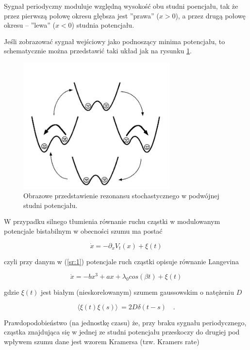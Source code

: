   Sygnał periodyczny moduluje względną wysokość obu studni poencjału, tak że przez pierwszą połowę okresu głębsza jest ''prawa'' ($x>0$), a przez drugą połowę okresu -- ''lewa'' ($x<0$) studnia potencjału.

  Jeśli zobrazować sygnał wejściowy jako podnoszący minima potencjału, to schematycznie można przedstawić taki układ jak na rysunku \ref{fig:graphics:double_well}.

  \begin{figure}
    \includegraphics[width=80mm]{images/sr.jpg}
    \caption{Obrazowe przedstawienie rezonansu stochastycznego w podwójnej studni potencjału.}
    \label{fig:graphics:double_well}
  \end{figure}

  W przypadku silnego tłumienia równanie ruchu cząstki w modulowanym potencjale bistabilnym w obecności szumu ma postać

  \begin{equation} \label{sr:2}
    \dot x = - \partial_x V_t(x) + \xi (t)
  \end{equation}

  czyli przy danym w (\ref{sr:1}) potencjale ruch cząstki opisuje równanie Langevina

  \begin{equation} \label{sr:3}
    \dot x = -bx ^3 + ax + \lambda_0 cos(\beta t) + \xi (t)
  \end{equation}

  gdzie $\xi (t)$ jest białym (nieskorelowanym) szumem gaussowskim o natężeniu $D$

  \begin{equation} \label{sr:noise_correlation}
    \langle \xi(t) \xi(s) \rangle\ = 2 D \delta (t-s) \quad .
  \end{equation}

  Prawdopodobieństwo (na jednostkę czasu) że, przy braku sygnału periodycznego, cząstka znajdująca się w jednej ze studni potencjału przeskoczy do drugiej pod wpływem szumu dane jest wzorem Kramersa (tzw. Kramers rate)

